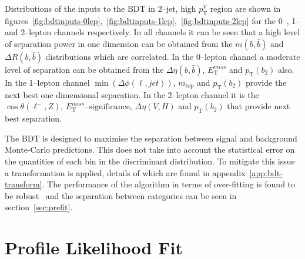 Distributions of the inputs to the BDT in 2--jet, high $p_{\mathrm{T}}^V$ region are shown
in
figures~\ref{fig:bdtinputs-0lep},~\ref{fig:bdtinputs-1lep},~\ref{fig:bdtinputs-2lep}
for the 0--, 1-- and 2--lepton channels respectively. In all channels it can be
seen that a high level of separation power in one dimension can be obtained from
the $m(b,\bar{b})$ and $\Delta R (b, \bar{b})$ distributions which are
correlated. In the 0--lepton channel a moderate level of separation can be
obtained from the $\Delta \eta(b, \bar{b})$, $E_{\mathrm{T}}^{miss}$ and $p_{\mathrm{T}}(b_2)$ also.
In the 1--lepton channel $\min(\Delta\phi(\ell,jet))$, $m_{\text{top}}$ and
$p_{\mathrm{T}}(b_2)$ provide the next best one dimensional separation. In the 2--lepton
channel it is the $\cos{\theta(\ell^-,Z)}$, $E_{\mathrm{T}}^{miss}\text{--significance}$,
$\Delta \eta(V, H)$ and $p_{\mathrm{T}}(b_2)$ that provide next best separation.


The BDT is designed to maximise the separation between signal and background
Monte-Carlo predictions. This does not take into account the statistical error
on the quantities of each bin in the discriminant distribution. To mitigate this
issue a transformation is applied, details of which are found in
appendix~\ref{app:bdt-transform}. The performance of the algorithm in terms of
over-fitting is found to be robust~\cite{VHMainNote2019} and the separation
between categories can be seen in section~\ref{sec:prefit}.

\section{Profile Likelihood Fit}%
\label{sec:plf}

